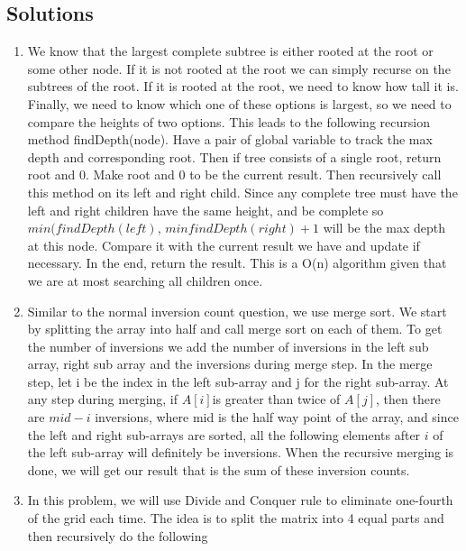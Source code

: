 \documentclass{article}
\begin{document}

\noindent
{}

\subsection*{Solutions}
\begin{enumerate}
    \item We know that the largest complete subtree is either rooted at the root or some other node. If it is not rooted at the root we can simply recurse on the subtrees of  the root. If it is rooted at the root, we need to know how tall it is. Finally, we need to know which one of these options is largest, so we need to compare the heights of two options. This leads to the following recursion method findDepth(node). Have a pair of global variable to track the max depth and corresponding root.
    Then if tree consists of a single root, return root and 0. Make root and 0 to be the current result. Then recursively call this method on its left and right child. Since any complete tree must have the left and right children have the same height, and be complete so $min(findDepth(left)$, $minfindDepth(right) + 1$ will be the max depth at this node. Compare it with the current result we have and update if necessary. In the end, return the result.
    This is a O(n) algorithm given that we are at most searching all children once.
    \item Similar to the normal inversion count question, we use merge sort. We start by splitting the array into half and call merge sort on each of them. To get the number of inversions we add the number of inversions in the left sub array, right sub array and the inversions during merge step. In the merge step, let i be the index in the left sub-array and j for the right sub-array. At any step during merging, if $A[i] $is greater than twice of $A[j]$, then there are $mid - i$ inversions, where mid is the half way point of the array, and since the left and right sub-arrays are sorted, all the following elements after $i$ of the left sub-array will definitely be inversions. When the recursive merging is done, we will get our result that is the sum of these inversion counts.
    \item In this problem, we will use Divide and Conquer rule to eliminate one-fourth of the grid each time. The idea is to split the matrix into 4 equal parts and then recursively do the following 

\end{enumerate}
\end{document}
